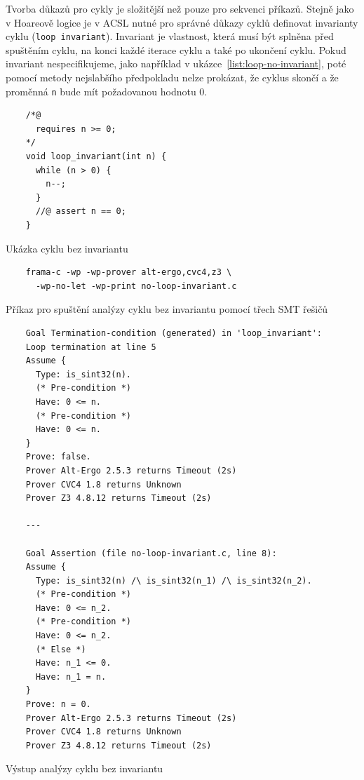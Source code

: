 Tvorba důkazů pro cykly je složitější než pouze pro sekvenci příkazů.
Stejně jako v Hoareově logice je v ACSL nutné pro správné důkazy cyklů definovat invarianty cyklu (\texttt{loop invariant}).
Invariant je vlastnost, která musí být splněna před spuštěním cyklu,
na konci každé iterace cyklu a také po ukončení cyklu.
Pokud invariant nespecifikujeme, jako například v ukázce~\ref{list:loop-no-invariant},
poté pomocí metody nejslabšího předpokladu nelze prokázat,
že cyklus skončí a že proměnná \texttt{n} bude mít požadovanou hodnotu 0.

\begin{listing}[H]
    \begin{verbatim}
    /*@
      requires n >= 0;
    */
    void loop_invariant(int n) {
      while (n > 0) {
        n--;
      }
      //@ assert n == 0;
    }
    \end{verbatim}
    \caption{Ukázka cyklu bez invariantu}
    \label{list:loop-no-invariant}
\end{listing}

\begin{listing}[H]
    \begin{verbatim}
    frama-c -wp -wp-prover alt-ergo,cvc4,z3 \
      -wp-no-let -wp-print no-loop-invariant.c
    \end{verbatim}
    \caption{Příkaz pro spuštění analýzy cyklu bez invariantu pomocí třech SMT řešičů}
    \label{list:loop-no-invariant-command}
\end{listing}

\begin{listing}[H]
    \begin{verbatim}
    Goal Termination-condition (generated) in 'loop_invariant':
    Loop termination at line 5
    Assume {
      Type: is_sint32(n).
      (* Pre-condition *)
      Have: 0 <= n.
      (* Pre-condition *)
      Have: 0 <= n.
    }
    Prove: false.
    Prover Alt-Ergo 2.5.3 returns Timeout (2s)
    Prover CVC4 1.8 returns Unknown
    Prover Z3 4.8.12 returns Timeout (2s)

    ---

    Goal Assertion (file no-loop-invariant.c, line 8):
    Assume {
      Type: is_sint32(n) /\ is_sint32(n_1) /\ is_sint32(n_2).
      (* Pre-condition *)
      Have: 0 <= n_2.
      (* Pre-condition *)
      Have: 0 <= n_2.
      (* Else *)
      Have: n_1 <= 0.
      Have: n_1 = n.
    }
    Prove: n = 0.
    Prover Alt-Ergo 2.5.3 returns Timeout (2s)
    Prover CVC4 1.8 returns Unknown
    Prover Z3 4.8.12 returns Timeout (2s)
    \end{verbatim}
    \caption{Výstup analýzy cyklu bez invariantu}
    \label{list:loop-no-invariant-output}
\end{listing}

